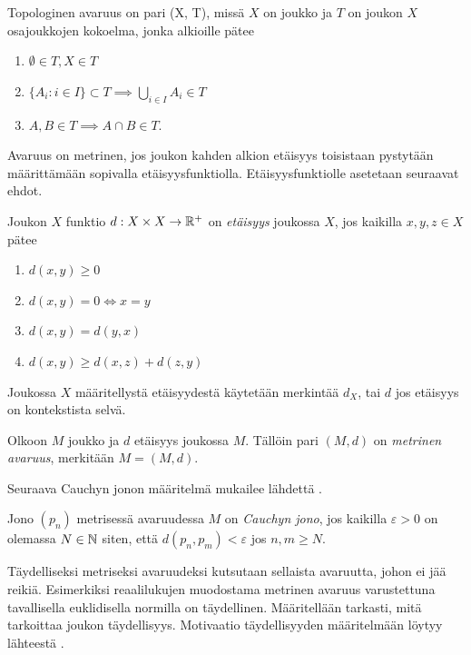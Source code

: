 \documentclass[12pt,oneside,a4paper]{amsbook} %
\begin{document}
\begin{definition}
    Topologinen avaruus on pari (X, T), missä $X$ on joukko ja $T$ on joukon $X$ osajoukkojen kokoelma, jonka alkioille pätee
    \begin{enumerate}
        \item $\displaystyle \emptyset \in T, X \in T$
        \item $\displaystyle \{A_i : i\in I\} \subset T \implies \bigcup_{i \in I} A_i \in T$
        \item $\displaystyle A, B \in T \implies A\cap B \in T$.
    \end{enumerate}
\end{definition}

Avaruus on metrinen, jos joukon kahden alkion etäisyys toisistaan pystytään määrittämään sopivalla etäisyysfunktiolla. Etäisyysfunktiolle asetetaan seuraavat ehdot.

\begin{definition}
    Joukon $X$ funktio $d: X\times X \to \mathbb{R}^+$ on \textit{etäisyys} joukossa $X$, jos kaikilla $x, y, z \in X$ pätee
    \begin{enumerate}
        \item $d(x,y) \ge 0$
        \item $d(x,y) = 0 \iff x = y$
        \item $d(x,y) = d(y,x)$
        \item $d(x,y) \ge d(x,z) + d(z,y)$
    \end{enumerate}
    Joukossa $X$ määritellystä etäisyydestä käytetään merkintää $d_X$, tai $d$ jos etäisyys on kontekstista selvä. 
\end{definition}

\begin{definition}
    Olkoon $M$ joukko ja $d$ etäisyys joukossa $M$. Tällöin pari $(M, d)$ on \textit{metrinen avaruus}, merkitään $M = (M, d)$.
\end{definition}

Seuraava Cauchyn jonon määritelmä mukailee lähdettä  \cite[s.52]{rudin}.

\begin{definition}
    Jono $(p_n)$ metrisessä avaruudessa $M$ on \textit{Cauchyn jono}, jos kaikilla $\varepsilon > 0$ on olemassa $N\in \mathbf{\mathbb{N}}$ siten, että $d(p_n, p_m) < \varepsilon$ jos $n, m\ge N$.
\end{definition}

Täydelliseksi metriseksi avaruudeksi kutsutaan sellaista avaruutta, johon ei jää reikiä. Esimerkiksi reaalilukujen muodostama metrinen avaruus varustettuna tavallisella euklidisella normilla on täydellinen. Määritellään tarkasti, mitä tarkoittaa joukon täydellisyys. Motivaatio täydellisyyden määritelmään löytyy lähteestä \cite[s.54]{rudin}.
\end{document}
